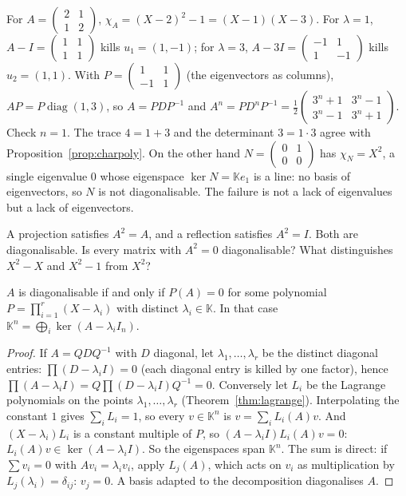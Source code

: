\begin{examplex}
For $A=\begin{pmatrix}2&1\\1&2\end{pmatrix}$, $\chi_A=(X-2)^2-1=(X-1)(X-3)$. For $\lambda=1$, $A-I=\begin{pmatrix}1&1\\1&1\end{pmatrix}$ kills $u_1=(1,-1)$; for $\lambda=3$, $A-3I=\begin{pmatrix}-1&1\\1&-1\end{pmatrix}$ kills $u_2=(1,1)$. With $P=\begin{pmatrix}1&1\\-1&1\end{pmatrix}$ (the eigenvectors as columns), $AP=P\operatorname{diag}(1,3)$, so $A=PDP^{-1}$ and $A^n=PD^nP^{-1}=\frac12\begin{pmatrix}3^n+1&3^n-1\\3^n-1&3^n+1\end{pmatrix}$. Check $n=1$. The trace $4=1+3$ and the determinant $3=1\cdot3$ agree with Proposition~\ref{prop:charpoly}. On the other hand $N=\begin{pmatrix}0&1\\0&0\end{pmatrix}$ has $\chi_N=X^2$, a single eigenvalue $0$ whose eigenspace $\ker N=\mathbb Ke_1$ is a line: no basis of eigenvectors, so $N$ is not diagonalisable. The failure is not a lack of eigenvalues but a lack of eigenvectors.
\end{examplex}

\begin{think}
A projection satisfies $A^2=A$, and a reflection satisfies $A^2=I$. Both are diagonalisable. Is every matrix with $A^2=0$ diagonalisable? What distinguishes $X^2-X$ and $X^2-1$ from $X^2$?
\end{think}

\begin{theorem}[diagonalisability]\label{thm:diag}
$A$ is diagonalisable if and only if $P(A)=0$ for some polynomial $P=\prod_{i=1}^r(X-\lambda_i)$ with distinct $\lambda_i\in\mathbb K$. In that case $\mathbb K^n=\bigoplus_i\ker(A-\lambda_iI_n)$.
\end{theorem}
\begin{proof}
If $A=QDQ^{-1}$ with $D$ diagonal, let $\lambda_1,\dots,\lambda_r$ be the distinct diagonal entries: $\prod(D-\lambda_iI)=0$ (each diagonal entry is killed by one factor), hence $\prod(A-\lambda_iI)=Q\prod(D-\lambda_iI)Q^{-1}=0$.
Conversely let $L_i$ be the Lagrange polynomials on the points $\lambda_1,\dots,\lambda_r$ (Theorem~\ref{thm:lagrange}). Interpolating the constant $1$ gives $\sum_iL_i=1$, so every $v\in\mathbb K^n$ is $v=\sum_iL_i(A)v$. And $(X-\lambda_i)L_i$ is a constant multiple of $P$, so $(A-\lambda_iI)L_i(A)v=0$: $L_i(A)v\in\ker(A-\lambda_iI)$. So the eigenspaces span $\mathbb K^n$. The sum is direct: if $\sum v_i=0$ with $Av_i=\lambda_iv_i$, apply $L_j(A)$, which acts on $v_i$ as multiplication by $L_j(\lambda_i)=\delta_{ij}$: $v_j=0$. A basis adapted to the decomposition diagonalises $A$.
\end{proof}

